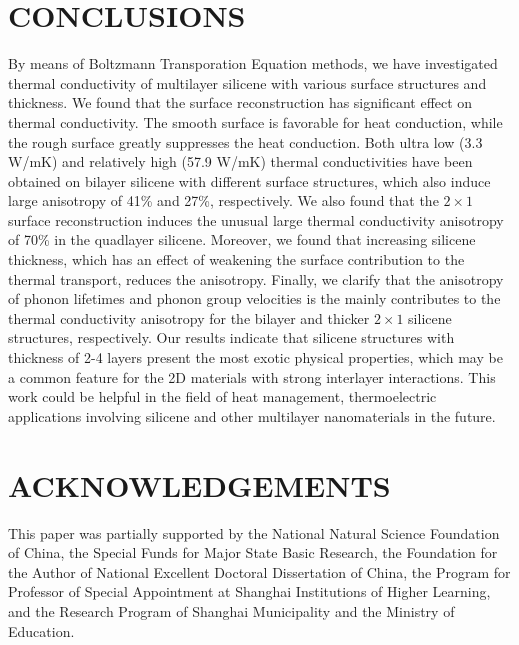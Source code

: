 \documentclass[aps,prb,twocolumn,showpacs,amsmath,amssymb]{revtex4-1}
\begin{document}
\section{CONCLUSIONS}
By means of Boltzmann Transporation Equation methods, we have investigated thermal conductivity of multilayer silicene with various surface structures and thickness.
We found that the surface reconstruction has significant effect on thermal conductivity.  The smooth surface is favorable for heat conduction, while the rough surface greatly suppresses the heat conduction. Both ultra low (3.3 W/mK) and relatively high (57.9 W/mK) thermal conductivities have been obtained on bilayer silicene with different surface structures, which also induce large anisotropy of 41\% and 27\%, respectively. We also found that the $2 \times 1$  surface reconstruction induces the unusual large thermal conductivity anisotropy of 70\%  in the quadlayer silicene.  Moreover, we found that increasing silicene thickness, which has an effect of weakening the surface contribution to the thermal transport,  reduces the anisotropy. Finally, we clarify that the anisotropy of phonon lifetimes and phonon group velocities is the mainly contributes to   the thermal conductivity anisotropy for the bilayer and thicker $2\times 1$ silicene structures, respectively. Our results indicate that silicene structures with thickness of 2-4 layers present the most  exotic physical  properties, which may be a common feature for the 2D materials with strong interlayer interactions.
This work could be helpful in the field of heat management, thermoelectric applications involving silicene and other multilayer nanomaterials in the future.


\section{ACKNOWLEDGEMENTS}
This paper was partially supported by the National Natural Science Foundation of China, the Special Funds for Major State Basic Research, the Foundation for the Author of National Excellent Doctoral Dissertation of China, the Program for Professor of Special Appointment at Shanghai Institutions of Higher Learning, and the Research Program of Shanghai Municipality and the Ministry of Education.



\end{document}
